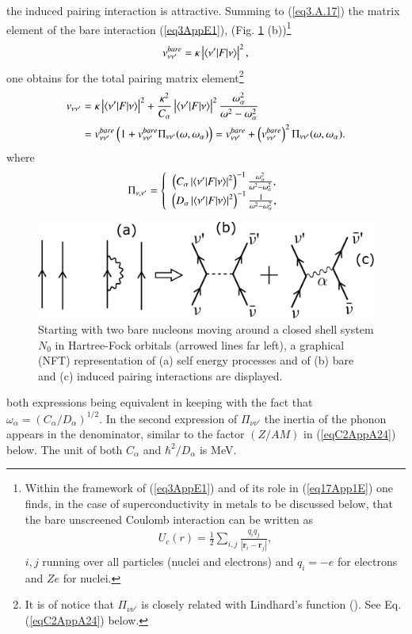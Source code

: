  the induced pairing interaction is attractive.
Summing to (\ref{eq3.A.17}) the matrix element of the bare interaction (\ref{eq3AppE1}), (Fig. \ref{fig3_A_3} (b))\footnote{Within the framework of (\ref{eq3AppE1}) and of its role in (\ref{eq17App1E}) one finds, in the case of superconductivity in metals to be discussed below,  that the bare unscreened Coulomb interaction can be written as 
	\begin{align*}
	U_c(r)=\frac{1}{2}\sum_{i,j}\frac{q_iq_j}{|\mathbf r_i-\mathbf r_j|}, 
	\end{align*}
	$i,j$ running over all particles (nuclei and electrons) and $q_i=-e$ for electrons and $Ze$ for nuclei.}
\begin{align}
v_{\nu\nu'}^{bare}=\kappa\left|\langle {\nu'|F|\nu} \rangle\right|^2,
\end{align}
one obtains for the total pairing matrix element\footnote{It is of notice that $\Pi_{\nu\nu'}$ is closely related with Lindhard's function (\cite{Lindhard:53}). See Eq. (\ref{eqC2AppA24}) below.}
\begin{align}\label{eq17App1E}
\nonumber v_{\nu\nu'}&=\kappa\left|\langle {\nu'|F|\nu} \rangle\right|^2+\frac{\kappa^2}{C_\alpha}\left|\langle {\nu'|F|\nu} \rangle\right|^2\frac{\omega_\alpha^2}{\omega^2-\omega_\alpha^2}\\
&=v_{\nu\nu'}^{bare}\left(1+v_{\nu\nu'}^{bare}\Pi_{\nu\nu'}(\omega,\omega_\alpha)\right)=v^{bare}_{\nu\nu'}+\left(v^{bare}_{\nu\nu'}\right)^2\Pi_{\nu\nu'}(\omega,\omega_\alpha).
\end{align}
where
\begin{align}
\Pi_{\nu,\nu'}=\left\{\begin{array}{c}
 \left(C_\alpha\left|\langle {\nu'|F|\nu} \rangle\right|^2\right)^{-1}\frac{\omega_\alpha^2}{\omega^2-\omega_\alpha^2},\\ 
\left(D_\alpha\left|\langle {\nu'|F|\nu} \rangle\right|^2\right)^{-1}\frac{1}{\omega^2-\omega_\alpha^2},
\end{array}
\right. 
\end{align}
   \begin{figure}
   \centerline{\includegraphics*[width=12cm,angle=0	]{nutshell/figs/fig3_A_3}}
   \caption{Starting with two bare nucleons moving around a closed shell system $N_0$ in Hartree-Fock orbitals (arrowed lines far left), a graphical (NFT) representation of (a) self energy processes and of (b) bare and (c) induced pairing interactions are displayed.}\label{fig3_A_3}
   \end{figure}
both expressions being equivalent in keeping with the fact that $\omega_\alpha=(C_\alpha/D_\alpha)^{1/2}$. In the second expression of $\Pi_{\nu\nu'}$  the inertia of the phonon appears in the denominator, similar to the factor $(Z/AM)$  in (\ref{eqC2AppA24}) below. The unit of both $C_\alpha$ and $\hbar^2/D_\alpha$ is  MeV.

